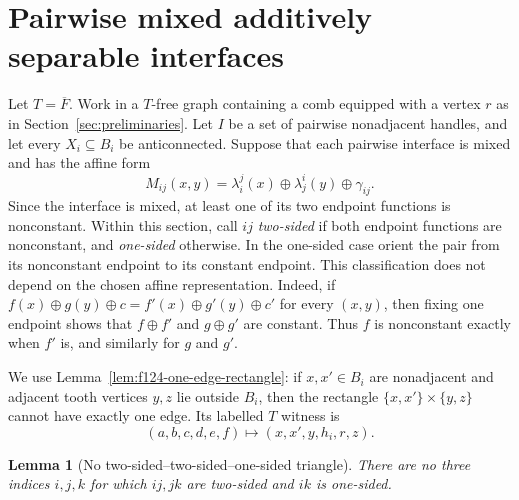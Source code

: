 \documentclass[11pt]{article}
\numberwithin{equation}{section}
\theoremstyle{plain}
\newtheorem{lemma}[theorem]{Lemma}
\theoremstyle{definition}
\begin{document}
\section{Pairwise mixed additively separable interfaces}
\label{sec:all-mixed}

Let $T=\overline F$.  Work in a $T$-free graph containing a comb
equipped with a vertex $r$ as in Section~\ref{sec:preliminaries}.
Let $I$ be a set of pairwise nonadjacent handles, and let every
$X_i\subseteq B_i$ be anticonnected.  Suppose that each
pairwise interface is mixed and has the affine form
\begin{equation}
 M_{ij}(x,y)=\lambda_i^j(x)\oplus\lambda_j^i(y)
                         \oplus\gamma_{ij}.
 \label{eq:all-mixed-affine}
\end{equation}
Since the interface is mixed, at least one of its two endpoint functions
is nonconstant.  Within this section, call $ij$ \emph{two-sided} if both endpoint
functions are nonconstant, and \emph{one-sided} otherwise.  In the one-sided case orient the pair
from its nonconstant endpoint to its constant endpoint.
This classification does not depend on the chosen affine
representation.  Indeed, if
$f(x)\oplus g(y)\oplus c=f'(x)\oplus g'(y)\oplus c'$ for every
$(x,y)$, then fixing one endpoint shows that $f\oplus f'$ and
$g\oplus g'$ are constant.  Thus $f$ is nonconstant exactly when $f'$
is, and similarly for $g$ and $g'$.

We use Lemma~\ref{lem:f124-one-edge-rectangle}: if
$x,x'\in B_i$ are nonadjacent and adjacent tooth vertices $y,z$ lie
outside $B_i$, then the rectangle
$\{x,x'\}\times\{y,z\}$ cannot have exactly one edge.  Its labelled
$T$ witness is
\begin{equation}
 (a,b,c,d,e,f)\longmapsto(x,x',y,h_i,r,z).
 \label{eq:all-mixed-one-edge-witness}
\end{equation}

\begin{lemma}[No two-sided--two-sided--one-sided triangle]
\label{lem:f124-type-no-p3}
There are no three indices $i,j,k$ for which $ij,jk$ are two-sided and $ik$
is one-sided.
\end{lemma}
\end{document}
